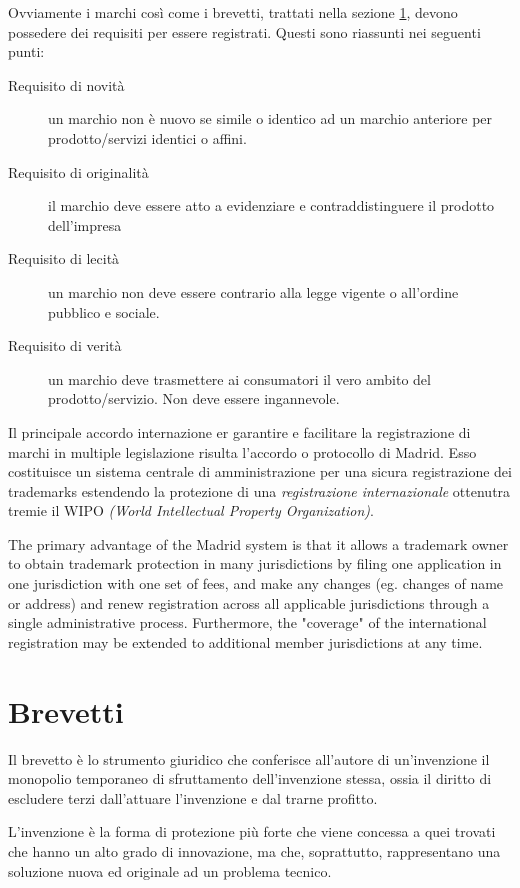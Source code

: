 Ovviamente i marchi così come i brevetti, trattati nella sezione \ref{sec:brevetti}, devono possedere dei requisiti per essere registrati. Questi sono riassunti nei seguenti punti:
\begin{description}
 \item[Requisito di novità] un marchio non è nuovo se simile o identico ad un marchio anteriore per prodotto/servizi identici o affini.
 \item[Requisito di originalità] il marchio deve essere atto a evidenziare e contraddistinguere il prodotto dell'impresa
 \item[Requisito di lecità] un marchio non deve essere contrario alla legge vigente o all'ordine pubblico e sociale.
 \item[Requisito di verità] un marchio deve trasmettere ai consumatori il vero ambito del prodotto/servizio. Non deve essere ingannevole. 
 \end{description}

Il principale accordo internazione er garantire e facilitare la registrazione di marchi in multiple legislazione risulta l'accordo o protocollo di Madrid. Esso costituisce un sistema centrale di amministrazione per una sicura registrazione dei trademarks estendendo la protezione di una \textit{registrazione internazionale} ottenutra tremie il WIPO \textit{(World Intellectual Property Organization)}. %

The primary advantage of the Madrid system is that it allows a trademark owner to obtain trademark protection in many jurisdictions by filing one application in one jurisdiction with one set of fees, and make any changes (eg. changes of name or address) and renew registration across all applicable jurisdictions through a single administrative process. Furthermore, the "coverage" of the international registration may be extended to additional member jurisdictions at any time.

\section{Brevetti} \label{sec:brevetti}
Il brevetto è lo strumento giuridico che conferisce all'autore di un'invenzione il monopolio temporaneo di sfruttamento dell'invenzione stessa, ossia il diritto di escludere terzi dall'attuare l'invenzione e dal trarne profitto. 

L'invenzione è la forma di protezione più forte che viene concessa a quei trovati che hanno un alto grado di innovazione, ma che, soprattutto, rappresentano una soluzione nuova ed originale ad un problema tecnico.

